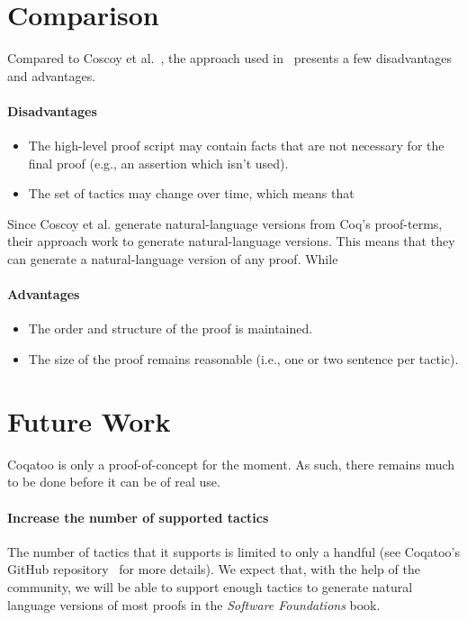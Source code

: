 \documentclass[sigplan,9pt]{acmart}\settopmatter{printfolios=true,printccs=false,printacmref=false}
\begin{document}
\pagebreak
\section{Comparison}
Compared to Coscoy et al.~\cite{DBLP:conf/tlca/CoscoyKT95,DBLP:conf/lacl/Coscoy96}, the approach used in \coqatoo\ presents a few disadvantages and advantages.
\paragraph{Disadvantages}
\begin{itemize}
  \item{The high-level proof script may contain facts that are not necessary for the final proof (e.g., an assertion which isn't used).}
  \item{The set of tactics may change over time, which means that \coqatoo\ }
\end{itemize}
Since Coscoy et al. generate natural-language versions from Coq's proof-terms, their approach work  to generate natural-language versions. This means that they can generate a natural-language version of any proof. While \coqatoo\ 

\paragraph{Advantages}
\begin{itemize}
  \item{The order and structure of the proof is maintained.}
  \item{The size of the proof remains reasonable (i.e., one or two sentence per tactic).}
\end{itemize}

\section{Future Work}
Coqatoo is only a proof-of-concept for the moment. As such, there remains much to be done before it can be of real use. 

\paragraph{Increase the number of supported tactics}
The number of tactics that it supports is limited to only a handful (see Coqatoo's GitHub repository~\cite{Coqatoo} for more details). We expect that, with the help of the community, we will be able to support enough tactics to generate natural language versions of most proofs in the \emph{Software Foundations} book.
\end{document}
